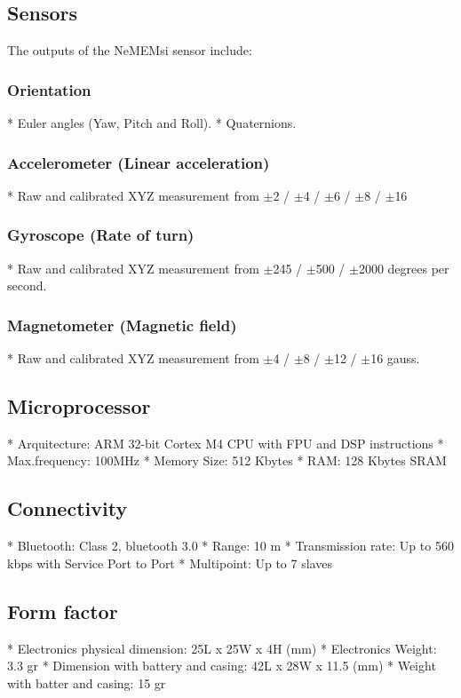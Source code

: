 \subsection*{Sensors}
The outputs of the NeMEMsi sensor include:

\subsubsection*{Orientation}
* Euler angles (Yaw, Pitch and Roll).
* Quaternions.

\subsubsection*{Accelerometer (Linear acceleration)}
* Raw and calibrated XYZ measurement from $\pm$2 / $\pm$4 / $\pm$6 / $\pm$8  / $\pm$16

\subsubsection*{Gyroscope (Rate of turn)}
* Raw and calibrated XYZ measurement from $\pm$245 /  $\pm$500 / $\pm$2000 degrees per second.

\subsubsection*{Magnetometer (Magnetic field)}
* Raw and calibrated XYZ measurement from $\pm$4 / $\pm$8 / $\pm$12 / $\pm$16 gauss.


\subsection*{Microprocessor}
* Arquitecture: ARM 32-bit Cortex M4 CPU with FPU and DSP instructions
* Max.frequency: 100MHz
* Memory Size: 512 Kbytes
* RAM: 128 Kbytes SRAM


\subsection*{Connectivity}
* Bluetooth: Class 2, bluetooth 3.0
* Range: 10 m
* Transmission rate: Up to 560 kbps with Service Port to Port
* Multipoint: Up to 7 slaves


\subsection*{Form factor}
* Electronics physical dimension: 25L x 25W x 4H (mm)
* Electronics Weight: 3.3 gr
* Dimension with battery and casing: 42L x 28W x 11.5 (mm)
* Weight with batter and casing: 15 gr


